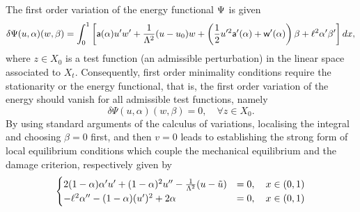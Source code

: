 The first order variation of the energy functional $\Psi$  is given   
\begin{equation}
    \delta \Psi(u,\alpha)(w,\beta)=\int_0^1
\left[\mathsf{a}(\alpha)u'w'+\frac{1}{\Lambda^2} (u-u_0) w+ \left( \frac{1}{2}u'^2 \mathsf{a}'(\alpha)+\mathsf{w}'(\alpha) \right)\beta+\ell^2\alpha'\beta' \right]dx,\label{firstvar1}
\end{equation}
where 
$z\in X_0$ is a test function (an admissible perturbation) in the linear space associated to $X_t$. Consequently, first order minimality conditions require the stationarity or the energy functional, that is, the first order variation of the energy should vanish for all admissible test functions, namely
\begin{equation}
    \label{eq:stationarity}
    \delta \Psi(u,\alpha)(w,\beta)=0, \quad \forall z\in X_0.
\end{equation}
By using standard arguments of the calculus of variations, localising the integral and choosing $\beta = 0$ first, and then $v =0$ leads to establishing the strong form of local equilibrium conditions which couple the mechanical equilibrium and the damage criterion, respectively given by
\begin{eqnarray}
\begin{cases}
  2(1-\alpha)\alpha' u' +(1-\alpha)^2 u'' -  \frac{1}{\Lambda^2}(u-\tilde u) &= 0, \quad {x\in (0, 1)}\\
  -\ell^2\alpha'' - (1-\alpha)( u')^2 + 2\alpha   &= 0, \quad {x\in (0, 1)}
\end{cases}
\label{auto1}
\end{eqnarray}
